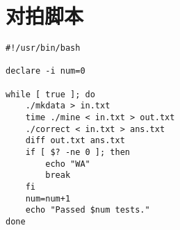 \section{对拍脚本}

\begin{verbatim}
#!/usr/bin/bash

declare -i num=0

while [ true ]; do
    ./mkdata > in.txt
    time ./mine < in.txt > out.txt
    ./correct < in.txt > ans.txt
    diff out.txt ans.txt
    if [ $? -ne 0 ]; then
        echo "WA"
        break
    fi
    num=num+1
    echo "Passed $num tests."
done
\end{verbatim}